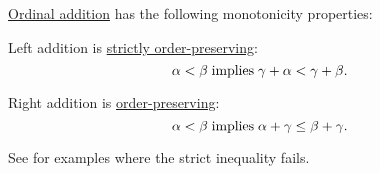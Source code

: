 \begin{proposition}\label{thm:ordinal_addition_is_monotone}
  \hyperref[def:ordinal_arithmetic/addition]{Ordinal addition} has the following monotonicity properties:
  \begin{thmenum}
     Left addition is \hyperref[eq:def:order_function/preserving/strict]{strictly order-preserving}:
    \begin{equation}\label{eq:thm:ordinal_addition_is_monotone/left}
      \alpha < \beta \T{implies} \gamma + \alpha < \gamma + \beta.
    \end{equation}

     Right addition is \hyperref[def:order_function/preserving]{order-preserving}:
    \begin{equation}\label{eq:thm:ordinal_addition_is_monotone/right}
      \alpha < \beta \T{implies} \alpha + \gamma \leq \beta + \gamma.
    \end{equation}

    See  for examples where the strict inequality fails.
  \end{thmenum}
\end{proposition}
